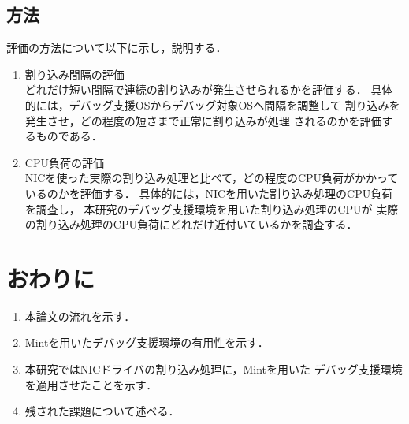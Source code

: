 \documentclass[tanilab-enum]{graduate}
\begin{document}
\section{方法}
評価の方法について以下に示し，説明する．
\begin{enumerate}
    \item 割り込み間隔の評価\\
        どれだけ短い間隔で連続の割り込みが発生させられるかを評価する．
        具体的には，デバッグ支援OSからデバッグ対象OSへ間隔を調整して
        割り込みを発生させ，どの程度の短さまで正常に割り込みが処理
        されるのかを評価するものである．
    \item CPU負荷の評価\\
        NICを使った実際の割り込み処理と比べて，どの程度のCPU負荷がかかって
        いるのかを評価する．
        具体的には，NICを用いた割り込み処理のCPU負荷を調査し，
        本研究のデバッグ支援環境を用いた割り込み処理のCPUが
        実際の割り込み処理のCPU負荷にどれだけ近付いているかを調査する．
\end{enumerate}
\chapter{おわりに}\label{conclusion}
\begin{enumerate}
    \item 本論文の流れを示す．
    \item Mintを用いたデバッグ支援環境の有用性を示す．
    \item 本研究ではNICドライバの割り込み処理に，Mintを用いた
        デバッグ支援環境を適用させたことを示す．
    \item 残された課題について述べる．
\end{enumerate}


%




% 
\end{document}
